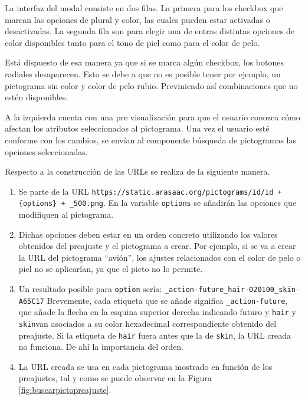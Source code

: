 La interfaz del modal consiste en dos filas. La primera para los checkbox que marcan las opciones de plural y color, las cuales pueden estar activadas o desactivadas. La segunda fila son para elegir una de entras distintas opciones de color disponibles tanto para el tono de piel como para el color de pelo.

Está dispuesto de esa manera ya que si se marca algún checkbox, los botones radiales desaparecen. Esto se debe a que no es posible tener por ejemplo, un pictograma sin color y color de pelo rubio. Previniendo así combinaciones que no estén disponibles.

A la izquierda cuenta con una pre visualización para que el usuario conozca cómo afectan los atributos seleccionados al pictograma. Una vez el usuario esté conforme con los cambios, se envían al componente búsqueda de pictogramas las opciones seleccionadas.

Respecto a la construcción de las URLs se realiza de la siguiente manera.

\begin{enumerate}
	\item Se parte de la URL \texttt{https://static.arasaac.org/pictograms/id/id + \{options\} + \_500.png}. En la variable \texttt{options} se añadirán las opciones que modifiquen al pictograma.
	
	
	\item Dichas opciones deben estar  en un orden concreto utilizando los valores obtenidos del preajuste y el pictograma a crear. Por ejemplo, si se va a crear la URL del  pictograma “avión”, los ajustes relacionados con el color de pelo o piel no se aplicarían, ya que el picto no lo permite.
	
	\item Un resultado posible para \texttt{option} sería: \texttt{\_action-future\_hair-020100\_skin-A65C17} Brevemente, cada etiqueta que se añade significa \texttt{\_action-future}, que añade la flecha en la esquina superior derecha indicando futuro y \texttt{hair} y \texttt{skin}van asociados a su color hexadecimal correspondiente obtenido del preajuste. Si la etiqueta de \texttt{hair} fuera antes que la de \texttt{skin}, la URL creada no funciona. De ahí la importancia del orden.
	
	\item La URL creada se usa en cada pictograma mostrado en función de los preajustes, tal y como se puede observar en la Figura \ref{fig:buscarpictopreajuste}.
	
\end{enumerate}



